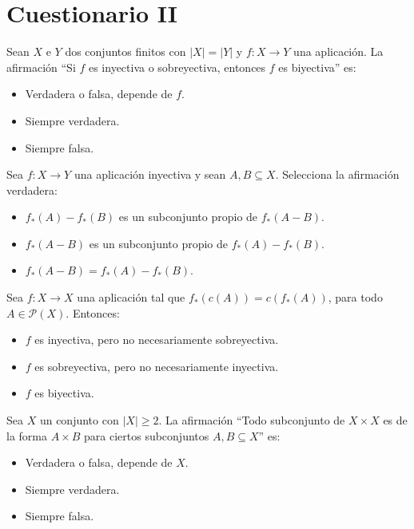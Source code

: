 \section{Cuestionario II}
\begin{ejercicio}
    Sean $X$ e $Y$ dos conjuntos finitos con $|X| = |Y|$ y $f:X \rightarrow Y$ una aplicación. La afirmación ``Si $f$ es inyectiva o sobreyectiva, entonces $f$ es biyectiva'' es:
    \begin{itemize}
        \item Verdadera o falsa, depende de $f$.
        \item Siempre verdadera.
        \item Siempre falsa.
    \end{itemize}
\end{ejercicio}

\begin{ejercicio}
    Sea $f:X \rightarrow Y$ una aplicación inyectiva y sean $A, B \subseteq X$. Selecciona la afirmación verdadera:
    \begin{itemize}
        \item $f_{*}(A) - f_{*}(B)$ es un subconjunto propio de $f_{*}(A-B)$.
        \item $f_{*}(A-B)$ es un subconjunto propio de $f_{*}(A) - f_{*}(B)$.
        \item $f_{*}(A-B) = f_{*}(A) - f_{*}(B)$.
    \end{itemize}
\end{ejercicio}

\begin{ejercicio}
    Sea $f:X \rightarrow X$ una aplicación tal que $f_{*}(c(A)) = c(f_{*}(A))$, para todo $A \in \mathcal{P}(X)$. Entonces:
    \begin{itemize}
        \item $f$ es inyectiva, pero no necesariamente sobreyectiva.
        \item $f$ es sobreyectiva, pero no necesariamente inyectiva.
        \item $f$ es biyectiva.
    \end{itemize}
\end{ejercicio}

\begin{ejercicio}
Sea $X$ un conjunto con $|X|\geq 2$. La afirmación ``Todo subconjunto de $X \times X$ es de la forma $A \times B$ para ciertos subconjuntos $A, B \subseteq X$'' es:
    \begin{itemize}
        \item Verdadera o falsa, depende de $X$.
        \item Siempre verdadera.
        \item Siempre falsa.
    \end{itemize}
\end{ejercicio}

